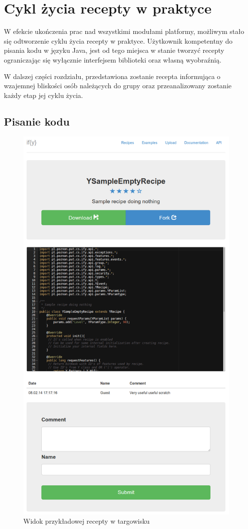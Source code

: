 \documentclass[11pt,a4paper,polish,thesis]{dcsbook}
\begin{document}
\section{Cykl życia recepty w praktyce}
W efekcie ukończenia prac nad wszystkimi modułami platformy, możliwym stało się odtworzenie cyklu życia recepty w praktyce. Użytkownik kompetentny do pisania
kodu w języku Java, jest od tego miejsca w stanie tworzyć recepty ograniczając się wyłącznie interfejsem biblioteki oraz własną wyobraźnią.

W dalszej części rozdziału, przedstawiona zostanie recepta informująca o wzajemnej bliskości osób należących do grupy oraz przeanalizowany zostanie każdy etap
jej cyklu życia.
\subsection{Pisanie kodu}
\begin{figure}[H]
  \centering
  \includegraphics[scale=0.4]{./resources/market_recipe.png}
  \caption{Widok przykładowej recepty w targowisku}
  \label{fig:market_recipe}
\end{figure}
\end{document}
